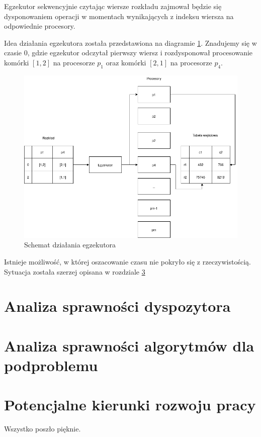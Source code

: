 \documentclass[brudnopis]{xmgr}
\begin{document}
Egzekutor sekwencyjnie czytając wiersze rozkładu zajmował będzie się dysponowaniem operacji w momentach wynikających z indeksu wiersza na odpowiednie procesory.

Idea działania egzekutora została przedstawiona na diagramie \ref{diag:executor}. Znadujemy się w czasie 0, gdzie egzekutor odczytał pierwszy wiersz i rozdysponował procesowanie komórki $[1,2]$ na procesorze $p_1$ oraz komórki $[2,1]$ na procesorze $p_4$.

\begin{figure}[!tbh]
\centering
\includegraphics[width=.8\hsize]{fig/executor.png}
\caption{Schemat działania egzekutora\label{diag:executor}}
\end{figure}

Istnieje możliwość, w której oszacowanie czasu nie pokryło się z rzeczywistością. Sytuacja została szerzej opisana w rozdziale \ref{chap:extend}

\chapter{Analiza sprawności dyspozytora}


\chapter{Analiza sprawności algorytmów dla podproblemu}


\chapter{Potencjalne kierunki rozwoju pracy} \label{chap:extend}


\summary

Wszystko poszło pięknie.
\end{document}
